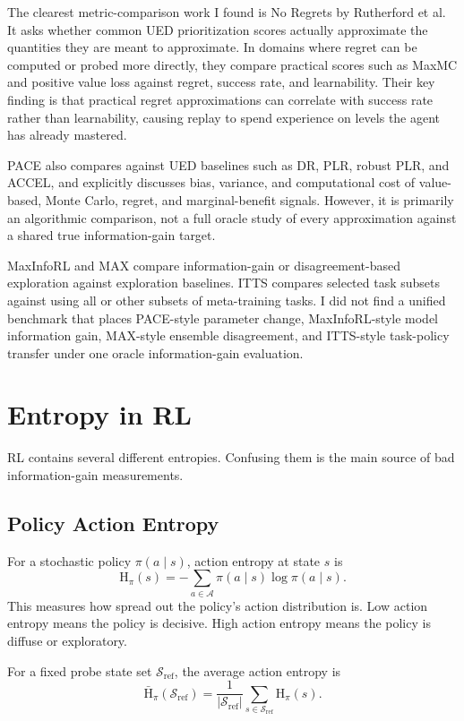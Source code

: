 \documentclass[11pt]{article}
\newcommand{\A}{\mathcal{A}}
\newcommand{\Sref}{\mathcal{S}_{\mathrm{ref}}}
\newcommand{\Hent}{\mathrm{H}}
\begin{document}
The clearest metric-comparison work I found is No Regrets by Rutherford et al.
It asks whether common UED prioritization scores actually approximate the
quantities they are meant to approximate. In domains where regret can be
computed or probed more directly, they compare practical scores such as MaxMC
and positive value loss against regret, success rate, and learnability. Their key
finding is that practical regret approximations can correlate with success rate
rather than learnability, causing replay to spend experience on levels the agent
has already mastered.

PACE also compares against UED baselines such as DR, PLR, robust PLR, and ACCEL,
and explicitly discusses bias, variance, and computational cost of value-based,
Monte Carlo, regret, and marginal-benefit signals. However, it is primarily an
algorithmic comparison, not a full oracle study of every approximation against a
shared true information-gain target.

MaxInfoRL and MAX compare information-gain or disagreement-based exploration
against exploration baselines. ITTS compares selected task subsets against using
all or other subsets of meta-training tasks. I did not find a unified benchmark
that places PACE-style parameter change, MaxInfoRL-style model information gain,
MAX-style ensemble disagreement, and ITTS-style task-policy transfer under one
oracle information-gain evaluation.

\section{Entropy in RL}

RL contains several different entropies. Confusing them is the main source of
bad information-gain measurements.

\subsection{Policy Action Entropy}

For a stochastic policy $\pi(a \mid s)$, action entropy at state $s$ is
\begin{equation}
  \Hent_{\pi}(s)
  =
  -\sum_{a \in \A}\pi(a \mid s)\log \pi(a \mid s).
\end{equation}
This measures how spread out the policy's action distribution is. Low action
entropy means the policy is decisive. High action entropy means the policy is
diffuse or exploratory.

For a fixed probe state set $\Sref$, the average action entropy is
\begin{equation}
  \bar{\Hent}_{\pi}(\Sref)
  =
  \frac{1}{|\Sref|}
  \sum_{s \in \Sref}\Hent_{\pi}(s).
\end{equation}
\end{document}

